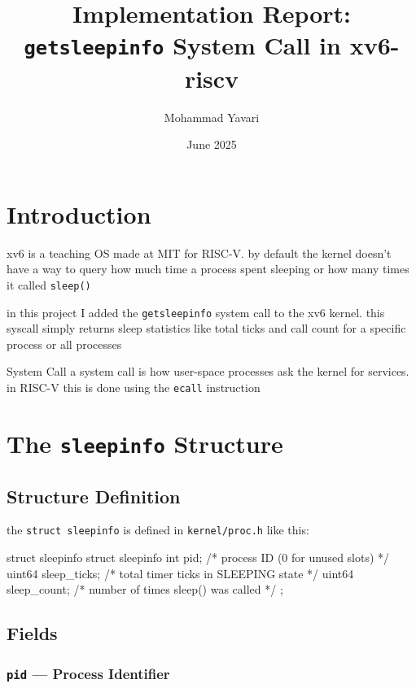 \documentclass[12pt]{report}
\title{%
    Implementation Report:\\
    \texttt{getsleepinfo} System Call in xv6-riscv%
}
\author{Mohammad Yavari}
\date{June 2025}
\begin{document}
\maketitle
\tableofcontents
\newpage

\chapter{Introduction}

xv6 is a teaching OS made at MIT for RISC-V. by default the kernel doesn't have a way to query how much time a process spent sleeping or how many times it called \texttt{sleep()}

in this project I added the \texttt{getsleepinfo} system call to the xv6 kernel. this syscall simply returns sleep statistics like total ticks and call count for a specific process or all processes

\begin{dfnbox}{System Call}
    a system call is how user-space processes ask the kernel for services. in RISC-V this is done using the \texttt{ecall} instruction
\end{dfnbox}

\chapter{The \texttt{sleepinfo} Structure}

\section{Structure Definition}

the \texttt{struct sleepinfo} is defined in \texttt{kernel/proc.h} like this:

\begin{cbox}{struct sleepinfo}
struct sleepinfo {
  int    pid;          /* process ID (0 for unused slots) */
  uint64 sleep_ticks;  /* total timer ticks in SLEEPING state */
  uint64 sleep_count;  /* number of times sleep() was called  */
};
\end{cbox}

\section{Fields}

\subsection{\texttt{pid} --- Process Identifier}
\end{document}
